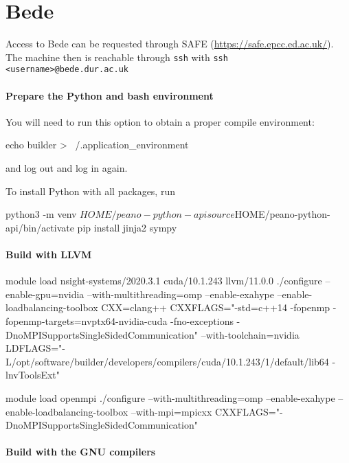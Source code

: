 


\section{Bede}


Access to Bede can be requested through SAFE
(\url{https://safe.epcc.ed.ac.uk/}).
The machine then is reachable through \texttt{ssh} with \texttt{ssh
<username>@bede.dur.ac.uk}


\paragraph{Prepare the Python and bash environment}

You will need to run this option to obtain a proper compile environment:
\begin{code}
echo builder > ~/.application_environment
\end{code}
and log out and log in again.


To install Python with all packages, run
\begin{code}
python3 -m venv $HOME/peano-python-api
source $HOME/peano-python-api/bin/activate
pip install jinja2 sympy
\end{code}



\paragraph{Build with LLVM}


\begin{code}
module load nsight-systems/2020.3.1 cuda/10.1.243 llvm/11.0.0
./configure --enable-gpu=nvidia --with-multithreading=omp --enable-exahype --enable-loadbalancing-toolbox CXX=clang++ CXXFLAGS="-std=c++14 -fopenmp -fopenmp-targets=nvptx64-nvidia-cuda -fno-exceptions -DnoMPISupportsSingleSidedCommunication" --with-toolchain=nvidia LDFLAGS="-L/opt/software/builder/developers/compilers/cuda/10.1.243/1/default/lib64 -lnvToolsExt"


module load openmpi
./configure --with-multithreading=omp --enable-exahype --enable-loadbalancing-toolbox --with-mpi=mpicxx CXXFLAGS="-DnoMPISupportsSingleSidedCommunication"
\end{code}


\paragraph{Build with the GNU compilers}


